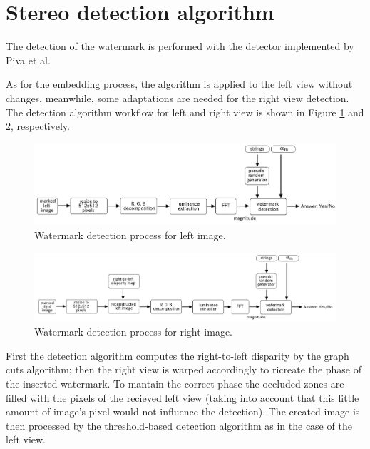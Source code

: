 \section{Stereo detection algorithm}

The detection of the watermark is performed with the detector implemented by Piva et al.\newline

As for the embedding process, the algorithm is applied to the left view without changes, meanwhile, some adaptations are needed for the right view detection. The detection algorithm workflow for left and right view is shown in Figure \ref{fig:left_dec} and \ref{fig:right_dec}, respectively. \newline

\begin{figure}[h!]
\centering
\includegraphics[width=1\textwidth]{./img/left_det.jpg}
\caption{\small{Watermark detection process for left image.}\label{fig:left_dec}}

\end{figure}

\begin{figure}[h!]
\centering
\includegraphics[width=1\textwidth]{./img/right_det.jpg}
\caption{\small{Watermark detection process for right image.}\label{fig:right_dec}}

\end{figure}



First the detection algorithm computes the right-to-left disparity by the graph cuts algorithm; then the right view is warped accordingly to ricreate the phase of the inserted watermark. To mantain the correct phase the occluded zones are filled with the pixels of the recieved left view (taking into account that this little amount of image's pixel would not influence the detection).\newline
The created image is then processed by the threshold-based detection algorithm as in the case of the left view.\newline 

